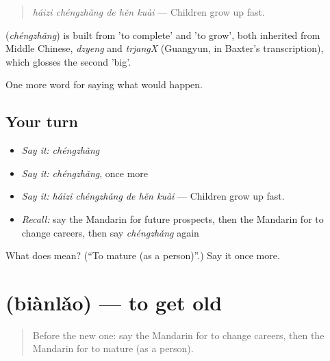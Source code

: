 \begin{quote}
\textbf{} \emph{háizi chéngzhǎng de hěn kuài} — Children grow up fast.
\end{quote}

\begin{cousinweb}
\textbf{} (\emph{chéngzhǎng}) is built from  'to complete' and  'to grow', both inherited from Middle Chinese, \emph{dzyeng} and \emph{trjangX} (Guangyun, in Baxter's transcription), which glosses the second 'big'.
\end{cousinweb}

\begin{grammarlens}[title={What you've built}]
One more word for saying what would happen.
\end{grammarlens}

\subsection*{Your turn}
\begin{itemize}
\raggedright
  \item \emph{Say it:} \emph{chéngzhǎng}
  \item \emph{Say it:} \emph{chéngzhǎng}, once more
  \item \emph{Say it:} \emph{háizi chéngzhǎng de hěn kuài} — Children grow up fast.
  \item \emph{Recall:} say the Mandarin for future prospects, then the Mandarin for to change careers, then say \emph{chéngzhǎng} again
\end{itemize}

\begin{tcolorbox}[breakable,colback=teal!4,colframe=teal!35!black,title={Before you move on}]
What does  mean? (\textquotedblleft{}To mature (as a person)\textquotedblright{}.) Say it once more.
\end{tcolorbox}
\section[\texorpdfstring{\zh{变老} (biànlǎo)}{变老 (biànlǎo)}]{ (biànlǎo) — to get old}

\label{lesson:ZH-C401-bianlao}



\begin{quote}
Before the new one: say the Mandarin for to change careers, then the Mandarin for to mature (as a person).
\end{quote}

